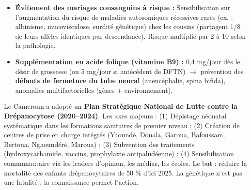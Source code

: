 \documentclass[11pt]{article}
\begin{document}
\begin{propriete}
\begin{itemize}
\begin{itemize}
        \item \textbf{Invasif :} Amniocentèse (15--18 SA, liquide amniotique), biopsie chorialaire (11--13 SA, trophoblaste). Caryotypage (bande G, FISH, puces à ADN / CGH-array). Risque de fausse couche $\approx 0,5--1 \%$. Indiqué si DPNI positif, antécédents, âge maternel $\ge 38$ ans, anomalie échographique.
    \end{itemize}
    \item \textbf{Évitement des mariages consanguins à risque :} Sensibilisation sur l'augmentation du risque de maladies autosomiques récessives rares (ex. : albinisme, mucoviscidose, surdité génétique) chez les cousins (partagent 1/8 de leurs allèles identiques par descendance). Risque multiplié par 2 à 10 selon la pathologie.
    \item \textbf{Supplémentation en acide folique (vitamine B9) :} 0,4 mg/jour dès le désir de grossesse (ou 5 mg/jour si antécédent de DFTN) $\to$ prévention des \textbf{défauts de fermeture du tube neural} (anencéphalie, spina bifida), anomalies multifactorielles (gènes + environnement).
\end{itemize}
\end{propriete}

\begin{savaistu}
Le Cameroun a adopté un \textbf{Plan Stratégique National de Lutte contre la Drépanocytose (2020--2024)}. Les axes majeurs : (1) Dépistage néonatal systématique dans les formations sanitaires de premier niveau ; (2) Création de centres de prise en charge intégrés (Yaoundé, Douala, Garoua, Bafoussam, Bertoua, Ngaoundéré, Maroua) ; (3) Subvention des traitements (hydroxycarbamide, vaccins, prophylaxie antipaludéenne) ; (4) Sensibilisation communautaire via les leaders d'opinion, les médias, les écoles. Le but : réduire la mortalité des enfants drépanocytaires de 50 \% d'ici 2025. La génétique n'est pas une fatalité : la connaissance permet l'action.
\end{savaistu}
\end{document}
